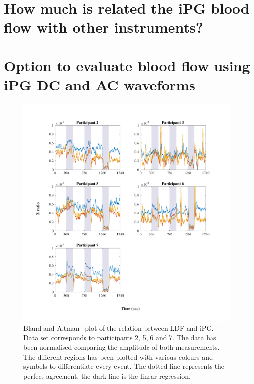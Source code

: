 \section{How much is related the iPG blood flow with other instruments?} %
\label{section discussion 4}

\section{Option to evaluate blood flow using iPG DC and AC waveforms}  %
\label{section discussion 3}


\begin{figure}[!htpb]
	\includegraphics[width=1\textwidth,keepaspectratio]{figure1}    
	\caption[Bland and Altman plot of the relation between LDF and iPG]{Bland and Altman~\cite{bland1986statistical} plot of the relation between LDF and iPG. Data set corresponds to participants 2, 5, 6 and 7. The data has been normalised comparing the amplitude of both measurements. The different regions has been plotted with various colours and symbols to differentiate every event. The dotted line represents the perfect agreement, the dark line is the linear regression.}
	\label{fig:ratio Z}
\end{figure}

